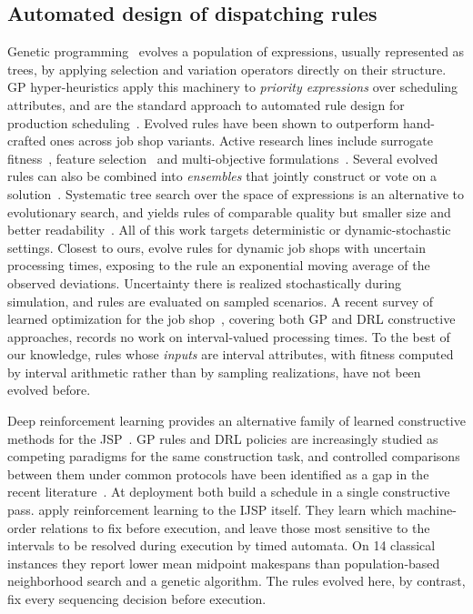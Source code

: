\documentclass[review,authoryear,11pt]{elsarticle}
\begin{document}
\subsection{Automated design of dispatching rules}
Genetic programming~\citep{Koza1992,Poli2008} evolves a population of
expressions, usually represented as trees, by applying selection and
variation operators directly on their structure. GP hyper-heuristics
apply this machinery to \emph{priority expressions} over scheduling
attributes, and are the standard approach to automated rule design for
production scheduling~\citep{Branke2016,Nguyen2017}. Evolved rules have
been shown to outperform hand-crafted ones across job shop variants.
Active research lines include surrogate fitness~\citep{Hildebrandt2015},
feature selection~\citep{Mei2017} and multi-objective
formulations~\citep{Nguyen2014}. Several evolved rules can also be
combined into \emph{ensembles} that jointly construct or vote on a
solution~\citep{GilGala2021Ensembles}. Systematic tree search over the
space of expressions is an alternative to evolutionary search, and
yields rules of comparable quality but smaller size and better
readability~\citep{GilGala2025SSHE}. All of this work targets
deterministic or dynamic-stochastic settings. Closest to ours,
\citet{Karunakaran2017} evolve rules for dynamic job shops with
uncertain processing times, exposing to the rule an exponential moving
average of the observed deviations. Uncertainty there is realized
stochastically during simulation, and rules are evaluated on sampled
scenarios. A recent survey of learned optimization for the job
shop~\citep{Xu2025}, covering both GP and DRL constructive approaches,
records no work on interval-valued processing times. To the best of our
knowledge, rules whose \emph{inputs} are interval attributes, with
fitness computed by interval arithmetic rather than by sampling
realizations, have not been evolved before.

Deep reinforcement learning provides an alternative family of learned
constructive methods for the JSP~\citep{Zhang2020L2D,Park2021GNN}. GP
rules and DRL policies are increasingly studied as competing paradigms
for the same construction task, and controlled comparisons between them
under common protocols have been identified as a gap in the recent
literature~\citep{Xu2025}. At deployment both build a schedule in a
single constructive pass. \citet{Han2026RAPO} apply reinforcement
learning to the IJSP itself. They learn which machine-order relations to
fix before execution, and leave those most sensitive to the intervals to
be resolved during execution by timed automata. On 14 classical
instances they report lower mean midpoint makespans than
population-based neighborhood search and a genetic algorithm. The rules
evolved here, by contrast, fix every sequencing decision before
execution.
\end{document}

